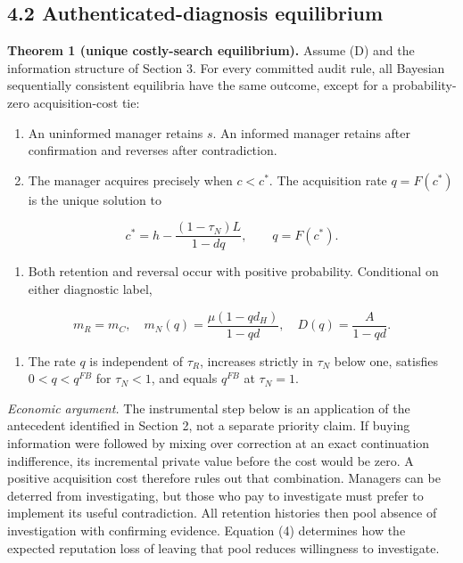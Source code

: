 \documentclass[
  11pt,
]{article}
\providecommand{\tightlist}{%
  \setlength{\itemsep}{0pt}\setlength{\parskip}{0pt}}
\begin{document}
\subsection{4.2 Authenticated-diagnosis
equilibrium}\label{authenticated-diagnosis-equilibrium}

\textbf{Theorem 1 (unique costly-search equilibrium).} Assume (D) and
the information structure of Section 3. For every committed audit rule,
all Bayesian sequentially consistent equilibria have the same outcome,
except for a probability-zero acquisition-cost tie:

\begin{enumerate}
\def\labelenumi{\arabic{enumi}.}
\tightlist
\item
  An uninformed manager retains \(s\). An informed manager retains after
  confirmation and reverses after contradiction.
\item
  The manager acquires precisely when \(c<c^*\). The acquisition rate
  \(q=F(c^*)\) is the unique solution to
\end{enumerate}

\[c^*=h-\frac{(1-\tau_N)L}{1-dq},\qquad q=F(c^*).\tag{4}\]

\begin{enumerate}
\def\labelenumi{\arabic{enumi}.}
\setcounter{enumi}{2}
\tightlist
\item
  Both retention and reversal occur with positive probability.
  Conditional on either diagnostic label,
\end{enumerate}

\[m_R=m_C,\quad m_N(q)=\frac{\mu(1-qd_H)}{1-qd},\quad D(q)=\frac{A}{1-qd}.\tag{5}\]

\begin{enumerate}
\def\labelenumi{\arabic{enumi}.}
\setcounter{enumi}{3}
\tightlist
\item
  The rate \(q\) is independent of \(\tau_R\), increases strictly in
  \(\tau_N\) below one, satisfies \(0<q<q^{FB}\) for \(\tau_N<1\), and
  equals \(q^{FB}\) at \(\tau_N=1\).
\end{enumerate}

\emph{Economic argument.} The instrumental step below is an application
of the antecedent identified in Section 2, not a separate priority
claim. If buying information were followed by mixing over correction at
an exact continuation indifference, its incremental private value before
the cost would be zero. A positive acquisition cost therefore rules out
that combination. Managers can be deterred from investigating, but those
who pay to investigate must prefer to implement its useful
contradiction. All retention histories then pool absence of
investigation with confirming evidence. Equation (4) determines how the
expected reputation loss of leaving that pool reduces willingness to
investigate.
\end{document}

